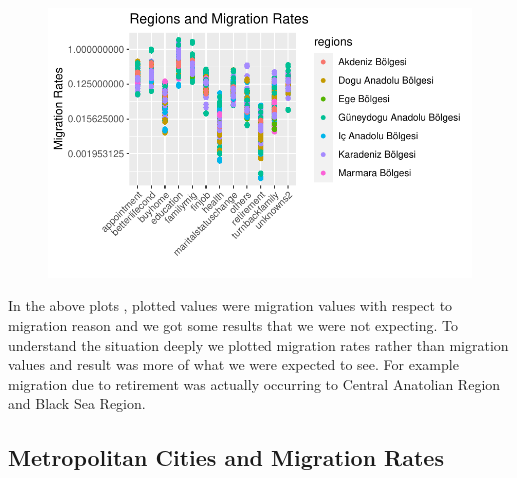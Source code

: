 \documentclass[
  11pt,
  a4paper,
  DIV=11,
  numbers=noendperiod]{scrartcl}
\begin{document}
\begin{figure}[H]

{\centering \includegraphics{analysis_files/figure-pdf/unnamed-chunk-5-1.pdf}

}

\end{figure}

In the above plots , plotted values were migration values with respect
to migration reason and we got some results that we were not expecting.
To understand the situation deeply we plotted migration rates rather
than migration values and result was more of what we were expected to
see. For example migration due to retirement was actually occurring to
Central Anatolian Region and Black Sea Region.

\hypertarget{metropolitan-cities-and-migration-rates}{%
\subsection{Metropolitan Cities and Migration
Rates}\label{metropolitan-cities-and-migration-rates}}
\end{document}
